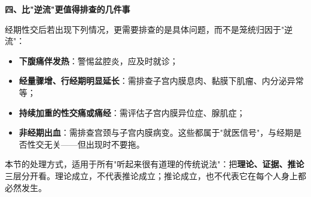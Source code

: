 \textbf{四、比"逆流"更值得排查的几件事}

经期性交后若出现下列情况，更需要排查的是具体问题，而不是笼统归因于"逆流"：

\begin{itemize}
\item \textbf{下腹痛伴发热}：警惕盆腔炎，应及时就诊；
\item \textbf{经量骤增、行经期明显延长}：需排查子宫内膜息肉、黏膜下肌瘤、内分泌异常等；
\item \textbf{持续加重的性交痛或痛经}：需评估子宫内膜异位症、腺肌症；
\item \textbf{非经期出血}：需排查宫颈与子宫内膜病变。这些都属于"就医信号"，与经期是否性交无关——但出现时不要拖。
\end{itemize}

\begin{tcolorbox}[colback=pink!5!white,colframe=red!50!black,title=贴心小叮咛]
本节的处理方式，适用于所有"听起来很有道理的传统说法"：把\textbf{理论、证据、推论}三层分开看。理论成立，不代表推论成立；推论成立，也不代表它在每个人身上都必然发生。
\end{tcolorbox}

